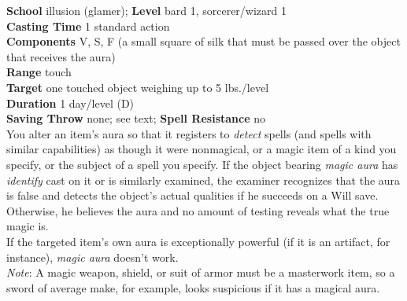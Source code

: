 \textbf{School} illusion (glamer); \textbf{Level} bard 1, sorcerer/wizard 1\\
\textbf{Casting Time} 1 standard action\\
\textbf{Components} V, S, F (a small square of silk that must be passed over the object that receives the aura)\\
\textbf{Range} touch\\
\textbf{Target} one touched object weighing up to 5 lbs./level\\
\textbf{Duration} 1 day/level (D)\\
\textbf{Saving Throw} none; see text; \textbf{Spell Resistance} no\\
You alter an item's aura so that it registers to \textit{detect }spells (and spells with similar capabilities) as though it were nonmagical, or a magic item of a kind you specify, or the subject of a spell you specify. If the object bearing \textit{magic aura }has \textit{identify }cast on it or is similarly examined, the examiner recognizes that the aura is false and detects the object's actual qualities if he succeeds on a Will save. Otherwise, he believes the aura and no amount of testing reveals what the true magic is.\\
If the targeted item's own aura is exceptionally powerful (if it is an artifact, for instance), \textit{magic aura }doesn't work.\\
\textit{Note}: A magic weapon, shield, or suit of armor must be a masterwork item, so a sword of average make, for example, looks suspicious if it has a magical aura.\\
